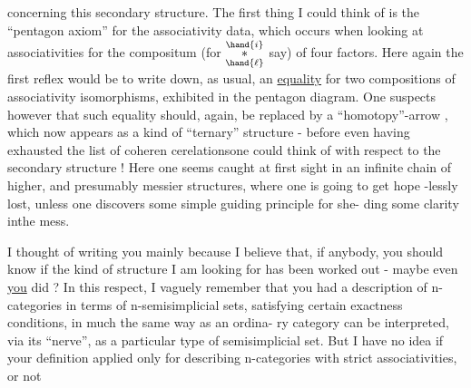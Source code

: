 

concerning this secondary structure. The first thing I could think of is
the ``pentagon axiom'' for the associativity data, which occurs when
 looking at associativities for the compositum (for $\overset{\hand{i}}{\underset{\hand{\ell}}{*}}$ say) of four factors.
Here again the first reflex would be to write down, as usual, an
\uline{equality} for  two compositions of associativity isomorphisms, exhibited
in the pentagon diagram. One suspects however that such equality should,
again, be replaced by a ``homotopy''-arrow , which now appears as a kind
of ``ternary'' structure - before even having exhausted the list of coheren%
cerelationsone could think of with respect to the secondary structure !
Here one seems caught at first sight in an infinite chain of 
higher, and presumably\hand{,} messier structures, where one is going to get hope%
-lessly lost, unless one discovers some simple guiding principle for she-%
ding some clarity in\hand{|}the mess.

 I thought of writing you mainly because I believe that, if anybody,
you should know if the kind of structure I am looking for has been worked
out - maybe even \uline{you} did ? In this respect, I vaguely remember that
you had a description of n-categories in terms of n-semisimplicial sets,
satisfying certain exactness conditions, in much the same way as an ordina-%
ry category can be interpreted, via its ``nerve'', as a particular type of
semisimplicial set. But I have no idea if your definition applied only
for describing n-categories with strict associativities, or not

